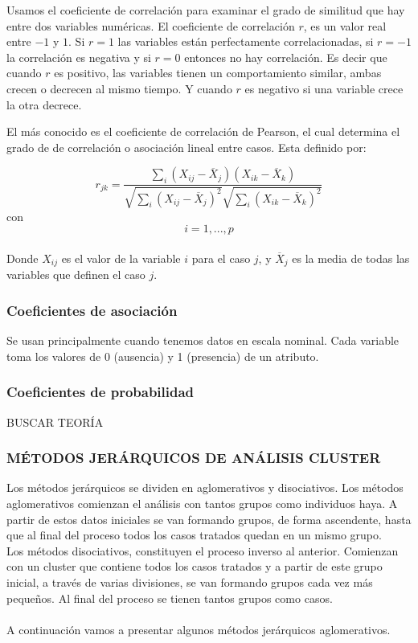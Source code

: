 \documentclass[letterpaper,12pt, spanish]{article}
\begin{document}
Usamos el coeficiente de correlación para examinar el grado de similitud que hay entre dos variables numéricas.  El coeficiente de correlación $r$, es un valor real entre $-1$ y $1$.  Si $r=1$ las variables están perfectamente correlacionadas, si $r=-1$ la correlación es negativa y si $r=0$ entonces no hay correlación.  Es decir que cuando $r$ es positivo, las variables tienen un comportamiento similar, ambas crecen o decrecen al mismo tiempo.  Y cuando $r$ es negativo si una variable crece la otra decrece. 

El más conocido es el coeficiente de correlación de Pearson, el cual determina el grado de de correlación o asociación lineal entre casos.  Esta definido por:

$$r_{jk}=\dfrac{\sum \limits_{i}(X_{ij}-\overline{X}_{j})(X_{ik}-\overline{X}_{k})}{\sqrt{\sum \limits_{i}(X_{ij}-\overline{X}_{j})^2} \sqrt{\sum \limits_{i}(X_{ik}-\overline{X}_{k})^2}}$$ con $$i= 1,...,p$$
\ \\
Donde $X_{ij}$ es el valor de la variable $i$ para el caso $j$, y $\overline{X}_j$ es la media de todas las variables que definen el caso $j$.  



\subsubsection*{Coeficientes de asociación}

Se usan principalmente cuando tenemos datos en escala nominal.  Cada variable toma los valores de 0 (ausencia) y 1 (presencia) de un atributo.
 
 \subsubsection*{Coeficientes de probabilidad}
 
 BUSCAR TEORÍA
 \subsubsection{MÉTODOS JERÁRQUICOS DE ANÁLISIS CLUSTER}
 Los métodos jerárquicos se dividen en aglomerativos y disociativos.  Los métodos aglomerativos comienzan el análisis con tantos grupos como individuos haya.  A partir de estos datos iniciales se van formando grupos, de forma ascendente, hasta que al final del proceso todos los casos tratados quedan en un mismo grupo.
 \ \\
 Los métodos disociativos, constituyen el proceso inverso al anterior.  Comienzan con un cluster que contiene todos los casos tratados y a partir de este grupo inicial, a través de varias divisiones, se van formando grupos cada vez más pequeños.  Al final del proceso se tienen tantos grupos como casos. 
 \ \\
 \ \\
 A continuación vamos a presentar algunos métodos jerárquicos aglomerativos.
 
\end{document}
